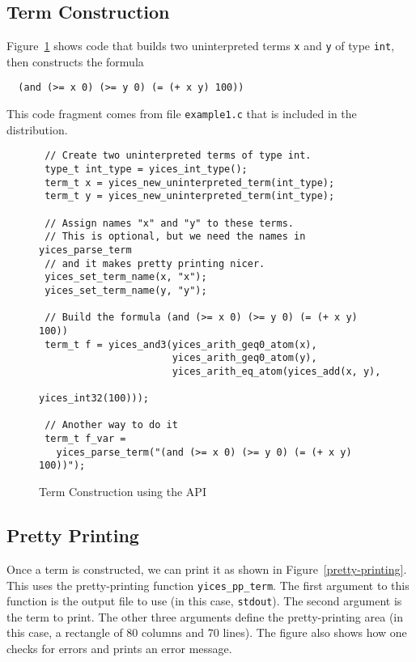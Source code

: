 \documentclass[11pt,twoside,fleqn,openright,titlepage]{cslreport}
\begin{document}
\subsection*{Term Construction}

Figure~\ref{term-construction} shows code that builds two
uninterpreted terms \texttt{x} and \texttt{y} of type \texttt{int},
then constructs the formula
\begin{small}
\begin{verbatim}
  (and (>= x 0) (>= y 0) (= (+ x y) 100))
\end{verbatim}
\end{small}
This code fragment comes from file \texttt{example1.c} that is
included in the distribution.


\begin{figure}
\begin{footnotesize}
\begin{verbatim}
 // Create two uninterpreted terms of type int.
 type_t int_type = yices_int_type();
 term_t x = yices_new_uninterpreted_term(int_type);
 term_t y = yices_new_uninterpreted_term(int_type);

 // Assign names "x" and "y" to these terms.
 // This is optional, but we need the names in yices_parse_term
 // and it makes pretty printing nicer.
 yices_set_term_name(x, "x");
 yices_set_term_name(y, "y");

 // Build the formula (and (>= x 0) (>= y 0) (= (+ x y) 100))
 term_t f = yices_and3(yices_arith_geq0_atom(x),
                       yices_arith_geq0_atom(y),
                       yices_arith_eq_atom(yices_add(x, y),
                                           yices_int32(100)));

 // Another way to do it
 term_t f_var =
   yices_parse_term("(and (>= x 0) (>= y 0) (= (+ x y) 100))");
\end{verbatim}
\end{footnotesize}
\caption{Term Construction using the API}
\label{term-construction}
\end{figure}

\subsection*{Pretty Printing}

Once a term is constructed, we can print it as shown in
Figure~\ref{pretty-printing}.  This uses the pretty-printing function
\texttt{yices\_pp\_term}. The first argument to this function is the
output file to use (in this case, \texttt{stdout}). The second
argument is the term to print. The other three arguments define the
pretty-printing area (in this case, a rectangle of 80 columns and 70
lines). The figure also shows how one checks for errors and prints
an error message.
\end{document}
